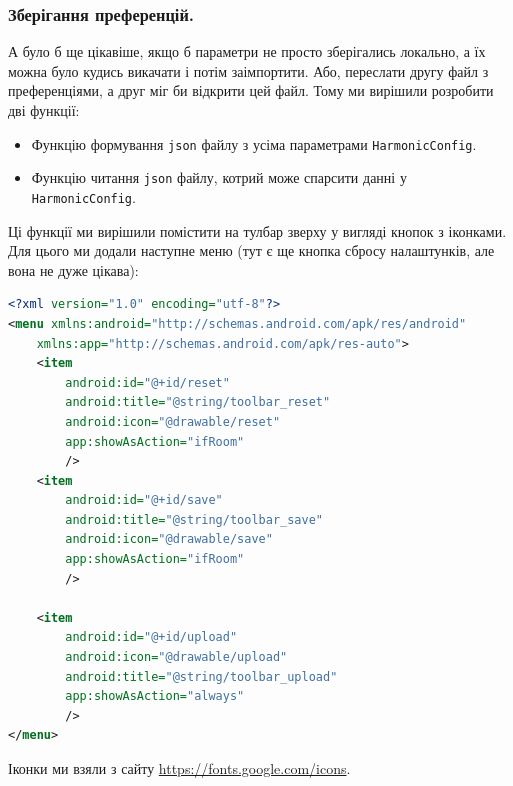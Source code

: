 \documentclass[oneside,solution]{android-assign}
\begin{document}
\subsubsection{Зберігання преференцій.} А було б ще цікавіше, якщо б параметри не просто зберігались локально, а їх можна було кудись викачати і потім заімпортити. Або, переслати другу файл з преференціями, а друг міг би відкрити цей файл. Тому ми вирішили розробити дві функції:
\begin{itemize}
    \item Функцію формування \texttt{json} файлу з усіма параметрами \texttt{HarmonicConfig}.
    \item Функцію читання \texttt{json} файлу, котрий може спарсити данні у \texttt{HarmonicConfig}.
\end{itemize}

Ці функції ми вирішили помістити на тулбар зверху у вигляді кнопок з іконками. Для цього ми додали наступне меню (тут є ще кнопка сбросу налаштунків, але вона не дуже цікава):
\begin{lstlisting}[language=xml]
<?xml version="1.0" encoding="utf-8"?>
<menu xmlns:android="http://schemas.android.com/apk/res/android"
    xmlns:app="http://schemas.android.com/apk/res-auto">
    <item
        android:id="@+id/reset"
        android:title="@string/toolbar_reset"
        android:icon="@drawable/reset"
        app:showAsAction="ifRoom"
        />
    <item
        android:id="@+id/save"
        android:title="@string/toolbar_save"
        android:icon="@drawable/save"
        app:showAsAction="ifRoom"
        />

    <item
        android:id="@+id/upload"
        android:icon="@drawable/upload"
        android:title="@string/toolbar_upload"
        app:showAsAction="always"
        />
</menu>
\end{lstlisting}

Іконки ми взяли з сайту \url{https://fonts.google.com/icons}. 
\end{document}
